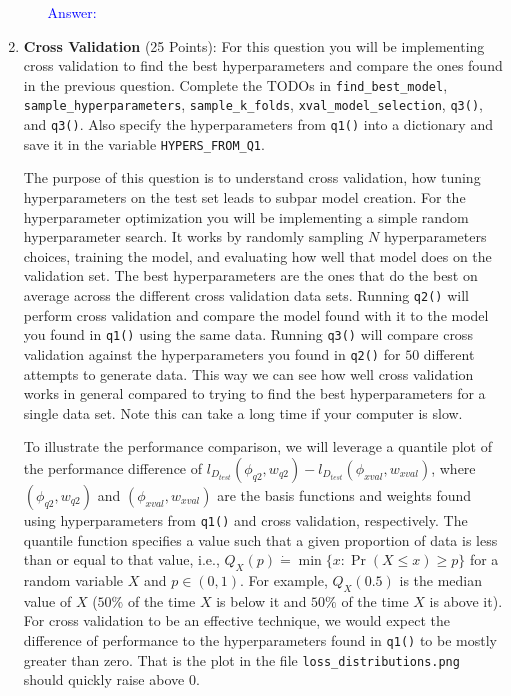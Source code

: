 \documentclass{article}
\begin{document}
\begin{enumerate}
\begin{enumerate}
        \textcolor{blue}{Answer: }
    \end{enumerate}

    \newpage
    \item \textbf{Cross Validation} (25 Points): For this question you will be implementing cross validation to find the best hyperparameters and compare the ones found in the previous question. Complete the TODOs in \texttt{find\_best\_model}, \texttt{sample\_hyperparameters}, \texttt{sample\_k\_folds}, \texttt{xval\_model\_selection}, \texttt{q3()}, and \texttt{q3()}. Also specify the hyperparameters from \texttt{q1()} into a dictionary and save it in the variable \texttt{HYPERS\_FROM\_Q1}. 
    
    The purpose of this question is to understand cross validation, how tuning hyperparameters on the test set leads to subpar model creation. For the hyperparameter optimization you will be implementing a simple random hyperparameter search. It works by randomly sampling $N$ hyperparameters choices, training the model, and evaluating how well that model does on the validation set. The best hyperparameters are the ones that do the best on average across the different cross validation data sets. Running \texttt{q2()} will perform cross validation and compare the model found with it to the model you found in \texttt{q1()} using the same data. Running \texttt{q3()} will compare cross validation against the hyperparameters you found in \texttt{q2()} for $50$ different attempts to generate data. This way we can see how well cross validation works in general compared to trying to find the best hyperparameters for a single data set. Note this can take a long time if your computer is slow. 
    
    To illustrate the performance comparison, we will leverage a quantile plot of the performance difference of $l_{D_{test}}(\phi_{q2},w_{q2})-l_{D_{test}}(\phi_{xval},w_{xval})$, where $(\phi_{q2},w_{q2})$ and $(\phi_{xval},w_{xval})$ are the basis functions and weights found using hyperparameters from \texttt{q1()} and cross validation, respectively. The quantile function specifies a value such that a given proportion of data is less than or equal to that value, i.e., $Q_X(p) \dot = \min \{x : \Pr(X \le x) \ge p\}$ for a random variable $X$ and $p \in (0,1)$. For example, $Q_X(0.5)$ is the median value of $X$ ($50\%$ of the time $X$ is below it and $50\%$ of the time $X$ is above it). For cross validation to be an effective technique, we would expect the difference of performance to the hyperparameters found in \texttt{q1()} to be mostly greater than zero. That is the plot in the file \texttt{loss\_distributions.png} should quickly raise above $0$. 


\end{enumerate}
\end{document}
